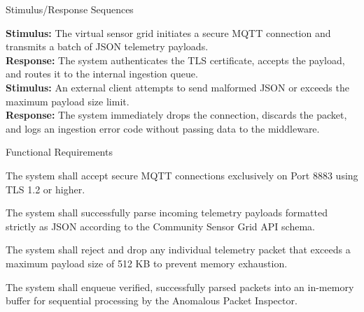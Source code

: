 \documentclass[12pt,letterpaper]{article}
\begin{document}
\par\vspace{0.083in}\noindent\hspace*{0.44in}Stimulus/Response Sequences\par\vspace{0.083in}
\begin{list}{}{\setlength{\leftmargin}{0.94in}\setlength{\rightmargin}{0pt}}\item[]
\textbf{Stimulus:} The virtual sensor grid initiates a secure MQTT connection and transmits a batch of JSON telemetry payloads.\\
\textbf{Response:} The system authenticates the TLS certificate, accepts the payload, and routes it to the internal ingestion queue.\\
\textbf{Stimulus:} An external client attempts to send malformed JSON or exceeds the maximum payload size limit.\\
\textbf{Response:} The system immediately drops the connection, discards the packet, and logs an ingestion error code without passing data to the middleware.
\end{list}

\par\vspace{0.083in}\noindent\hspace*{0.44in}Functional Requirements\par\vspace{0.083in}

\vspace{0.08in}
\noindent\hspace*{0.94in} The system shall accept secure MQTT connections exclusively on Port 8883 using TLS 1.2 or higher.\par
\vspace{0.04in}
\noindent\hspace*{0.94in} The system shall successfully parse incoming telemetry payloads formatted strictly as JSON according to the Community Sensor Grid API schema.\par
\vspace{0.04in}
\noindent\hspace*{0.94in} The system shall reject and drop any individual telemetry packet that exceeds a maximum payload size of 512 KB to prevent memory exhaustion.\par
\vspace{0.04in}
\noindent\hspace*{0.94in} The system shall enqueue verified, successfully parsed packets into an in-memory buffer for sequential processing by the Anomalous Packet Inspector.\par
\end{document}
